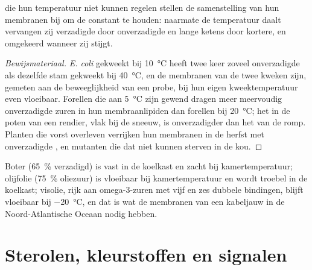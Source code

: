 \begin{proposition}\label{prop:b1:lipids:homeoviscous}
 die hun temperatuur niet kunnen regelen stellen de samenstelling van
hun membranen bij om de  constant te houden: naarmate de temperatuur
daalt vervangen zij verzadigde door onverzadigde  en lange ketens door
kortere, en omgekeerd wanneer zij stijgt.
\end{proposition}
\begin{proof}[Bewijsmateriaal]
\emph{E. coli} gekweekt bij \qty{10}{\celsius} heeft twee keer zoveel onverzadigde
 als dezelfde stam gekweekt bij \qty{40}{\celsius}, en de membranen van de
twee kweken zijn, gemeten aan de beweeglijkheid van een probe, bij hun eigen
kweektemperatuur even vloeibaar. Forellen die aan \qty{5}{\celsius} zijn gewend
dragen meer meervoudig onverzadigde zuren in hun membraanlipiden dan forellen bij
\qty{20}{\celsius}; het  in de poten van een rendier, vlak bij de sneeuw, is
onverzadigder dan het  van de romp. Planten die vorst overleven verrijken hun
membranen in de herfst met onverzadigde , en mutanten die dat niet kunnen
sterven in de kou.
\end{proof}

\begin{example}\label{ex:b1:lipids:kitchen}
Boter (\qty{65}{\%} verzadigd) is vast in de koelkast en zacht bij
kamertemperatuur; olijfolie (\qty{75}{\%} oliezuur) is vloeibaar bij
kamertemperatuur en wordt troebel in de koelkast; visolie, rijk aan
omega-3-zuren met vijf en zes dubbele bindingen, blijft vloeibaar bij
\qty{-20}{\celsius}, en dat is wat de membranen van een kabeljauw in de
Noord-Atlantische Oceaan nodig hebben.
\end{example}

\section{Sterolen, kleurstoffen en signalen}

